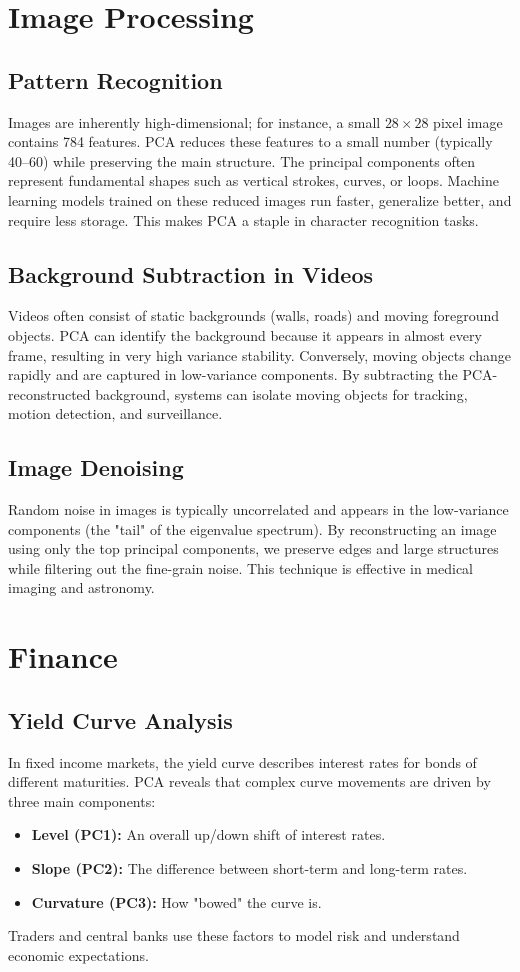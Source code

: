 \documentclass[12pt, a4paper]{report}
\begin{document}
\section{Image Processing}

\subsection{Pattern Recognition}
Images are inherently high-dimensional; for instance, a small $28 \times 28$ pixel image contains 784 features. PCA reduces these features to a small number (typically 40--60) while preserving the main structure. The principal components often represent fundamental shapes such as vertical strokes, curves, or loops. Machine learning models trained on these reduced images run faster, generalize better, and require less storage. This makes PCA a staple in character recognition tasks.

\subsection{Background Subtraction in Videos}
Videos often consist of static backgrounds (walls, roads) and moving foreground objects. PCA can identify the background because it appears in almost every frame, resulting in very high variance stability. Conversely, moving objects change rapidly and are captured in low-variance components. By subtracting the PCA-reconstructed background, systems can isolate moving objects for tracking, motion detection, and surveillance.

\subsection{Image Denoising}
Random noise in images is typically uncorrelated and appears in the low-variance components (the "tail" of the eigenvalue spectrum). By reconstructing an image using only the top principal components, we preserve edges and large structures while filtering out the fine-grain noise. This technique is effective in medical imaging and astronomy.

\section{Finance}

\subsection{Yield Curve Analysis}
In fixed income markets, the yield curve describes interest rates for bonds of different maturities. PCA reveals that complex curve movements are driven by three main components:
\begin{itemize}
    \item \textbf{Level (PC1):} An overall up/down shift of interest rates.
    \item \textbf{Slope (PC2):} The difference between short-term and long-term rates.
    \item \textbf{Curvature (PC3):} How "bowed" the curve is.
\end{itemize}
Traders and central banks use these factors to model risk and understand economic expectations.
\end{document}
